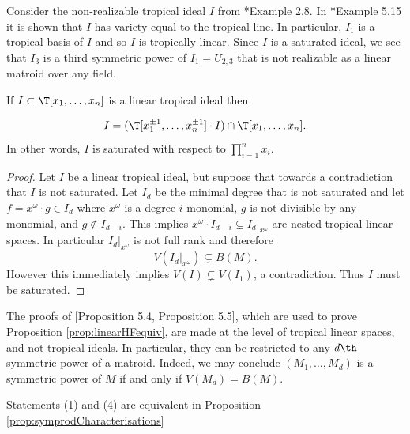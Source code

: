 \begin{example}\label{ex:nonrealizableSymprod}
Consider the non-realizable tropical ideal $I$ from \cite{MR16}*{Example 2.8}. In \cite{MR16}*{Example 5.15} it is shown that $I$ has variety equal to the tropical line. In particular, $I_1$ is a tropical basis of $I$ and so $I$ is tropically linear. Since $I$ is a saturated ideal, we see that $I_3$ is a third symmetric power of $I_1=U_{2,3}$ that is not realizable as a linear matroid over any field.
\end{example}

\begin{corollary}\label{cor:LTIsaturated}
If $I\subset \T[x_1,\dots,x_n]$ is a linear tropical ideal then

$$I = (\T[x_1^{\pm1},\dots,x_n^{\pm1}]\cdot I )\cap \T[x_1,\dots,x_n].$$
In other words, $I$ is saturated with respect to $\prod_{i=1}^n x_i$. 
\end{corollary}
\begin{proof}
Let $I$ be a linear tropical ideal, but suppose that towards a contradiction that $I$ is not saturated. Let $I_d$ be the minimal degree that is not saturated and let $f= x^\omega \cdot g\in I_d$ where $x^\omega$ is a degree $i$ monomial, $g$ is not divisible by any monomial, and $g\notin I_{d-i}$. This implies $x^\omega\cdot I_{d-i}\subsetneq I_d|_{x^\omega}$ are nested tropical linear spaces. In particular $I_d|_{x^\omega}$ is not full rank and therefore $$V(I_d|_{x^\omega})\subsetneq B(M).$$
However this immediately implies $V(I)\subsetneq V(I_1)$, a contradiction. Thus $I$ must be saturated.
\end{proof}

\begin{remark}\label{rem:bfCharacterisation}
The proofs of \cite{DR19}[Proposition 5.4, Proposition 5.5], which are used to prove Proposition \ref{prop:linearHFequiv}, are made at the level of tropical linear spaces, and not tropical ideals. In particular, they can be restricted to any $d\th$ symmetric power of a matroid. Indeed, we may conclude $(M_1,\dots,M_d)$ is a symmetric power of $M$ if and only if $V(M_d)= B(M)$. 
\end{remark}

\begin{corollary}
Statements (1) and (4) are equivalent in Proposition \ref{prop:symprodCharacterisations}
\end{corollary}

